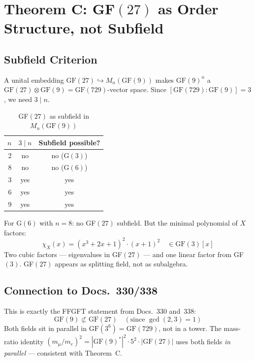 \section{Theorem C: GF$(27)$ as Order Structure, not Subfield}

\subsection{Subfield Criterion}

A unital embedding $\text{GF}(27) \hookrightarrow M_n(\text{GF}(9))$
makes $\text{GF}(9)^n$ a
$\text{GF}(27) \otimes \text{GF}(9) = \text{GF}(729)$-vector space.
Since $[\text{GF}(729):\text{GF}(9)] = 3$, we need $3 \mid n$.

\begin{table}[H]
\centering
\caption{GF$(27)$ as subfield in $M_n(\text{GF}(9))$}
\begin{tabular}{rcc}
\toprule
$n$ & $3 \mid n$ & Subfield possible? \\
\midrule
2 & no & no (G$(3)$) \\
8 & no & no (G$(6)$) \\
3 & yes & yes \\
6 & yes & yes \\
9 & yes & yes \\
\bottomrule
\end{tabular}
\end{table}

For G$(6)$ with $n = 8$: no GF$(27)$ subfield. But the
minimal polynomial of $X$ factors:
\begin{equation}
  \chi_X(x) = (x^3 + 2x + 1)^2 \cdot (x+1)^2
  \quad \in \text{GF}(3)[x]
\end{equation}
Two cubic factors --- eigenvalues in GF$(27)$ --- and one linear factor
from GF$(3)$. GF$(27)$ appears as splitting field, not as subalgebra.

\subsection{Connection to Docs.~330/338}

This is exactly the FFGFT statement from Docs.~330 and~338:
\begin{equation}
  \text{GF}(9) \not\subset \text{GF}(27) \quad (\text{since } \gcd(2,3) = 1)
\end{equation}
Both fields sit in parallel in $\text{GF}(3^6) = \text{GF}(729)$,
not in a tower. The mass-ratio identity
$(m_\mu/m_e)^2 = |\text{GF}(9)^*|^2 \cdot 5^2 \cdot |\text{GF}(27)|$
uses both fields \emph{in parallel} --- consistent with Theorem~C.

